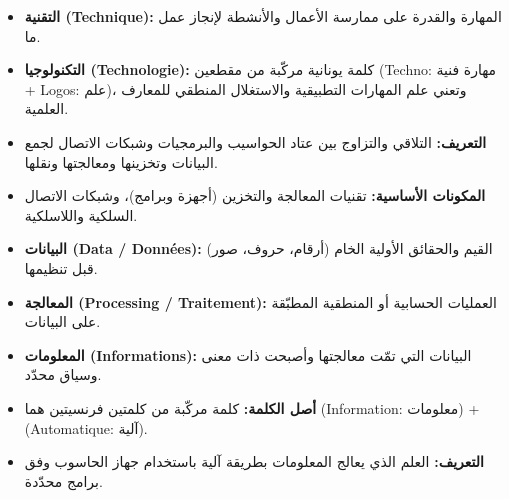 \documentclass[11pt, a4paper]{article}
\begin{document}
\begin{rememberbox}
  \begin{itemize}[label=\textbullet, leftmargin=1.1em, itemsep=2pt, topsep=1pt, parsep=0pt]
    \item \textbf{التقنية (Technique):} المهارة والقدرة على ممارسة الأعمال والأنشطة لإنجاز عمل ما.
    \item \textbf{التكنولوجيا (Technologie):} كلمة يونانية مركّبة من مقطعين (Techno: مهارة فنية + Logos: علم)، وتعني علم المهارات التطبيقية والاستغلال المنطقي للمعارف العلمية.
  \end{itemize}
\end{rememberbox}

\begin{rememberbox}
  \begin{itemize}[label=\textbullet, leftmargin=1.1em, itemsep=2pt, topsep=1pt, parsep=0pt]
    \item \textbf{التعريف:} التلاقي والتزاوج بين عتاد الحواسيب والبرمجيات وشبكات الاتصال لجمع البيانات وتخزينها ومعالجتها ونقلها.
    \item \textbf{المكونات الأساسية:} تقنيات المعالجة والتخزين (أجهزة وبرامج)، وشبكات الاتصال السلكية واللاسلكية.
  \end{itemize}
\end{rememberbox}

\begin{rememberbox}
  \begin{itemize}[label=\textbullet, leftmargin=1.1em, itemsep=2pt, topsep=1pt, parsep=0pt]
    \item \textbf{البيانات (Data / Données):} القيم والحقائق الأولية الخام (أرقام، حروف، صور) قبل تنظيمها.
    \item \textbf{المعالجة (Processing / Traitement):} العمليات الحسابية أو المنطقية المطبّقة على البيانات.
    \item \textbf{المعلومات (Informations):} البيانات التي تمّت معالجتها وأصبحت ذات معنى وسياق محدّد.
  \end{itemize}
\end{rememberbox}

\begin{rememberbox}
  \begin{itemize}[label=\textbullet, leftmargin=1.1em, itemsep=2pt, topsep=1pt, parsep=0pt]
    \item \textbf{أصل الكلمة:} كلمة مركّبة من كلمتين فرنسيتين هما (Information: معلومات) + (Automatique: آلية).
    \item \textbf{التعريف:} العلم الذي يعالج المعلومات بطريقة آلية باستخدام جهاز الحاسوب وفق برامج محدّدة.
  \end{itemize}
\end{rememberbox}
\end{document}
